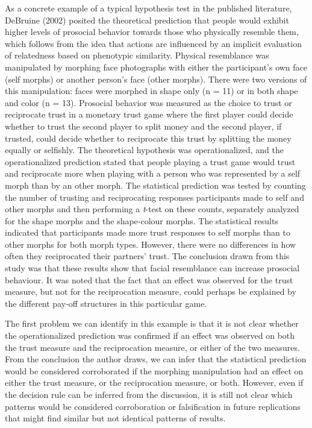 \documentclass[
  english,
  doc,floatsintext]{apa6}
\begin{document}
As a concrete example of a typical hypothesis test in the published literature, DeBruine (2002) posited the theoretical prediction that people would exhibit higher levels of prosocial behavior towards those who physically resemble them, which follows from the idea that actions are influenced by an implicit evaluation of relatedness based on phenotypic similarity. Physical resemblance was manipulated by morphing face photographs with either the participant's own face (self morphs) or another person's face (other morphs). There were two versions of this manipulation: faces were morphed in shape only (n = 11) or in both shape and color (n = 13). Prosocial behavior was measured as the choice to trust or reciprocate trust in a monetary trust game where the first player could decide whether to trust the second player to split money and the second player, if trusted, could decide whether to reciprocate this trust by splitting the money equally or selfishly. The theoretical hypothesis was operationalized, and the operationalized prediction stated that people playing a trust game would trust and reciprocate more when playing with a person who was represented by a self morph than by an other morph. The statistical prediction was tested by counting the number of trusting and reciprocating responses participants made to self and other morphs and then performing a \emph{t}-test on these counts, separately analyzed for the shape morphs and the shape-colour morphs. The statistical results indicated that participants made more trust responses to self morphs than to other morphs for both morph types. However, there were no differences in how often they reciprocated their partners' trust. The conclusion drawn from this study was that these results show that facial resemblance can increase prosocial behaviour. It was noted that the fact that an effect was observed for the trust measure, but not for the reciprocation measure, could perhaps be explained by the different pay-off structures in this particular game.

The first problem we can identify in this example is that it is not clear whether the operationalized prediction was confirmed if an effect was observed on both the trust measure and the reciprocation measure, or either of the two measures. From the conclusion the author draws, we can infer that the statistical prediction would be considered corroborated if the morphing manipulation had an effect on either the trust measure, or the reciprocation measure, or both. However, even if the decision rule can be inferred from the discussion, it is still not clear which patterns would be considered corroboration or falsification in future replications that might find similar but not identical patterns of results.
\end{document}
